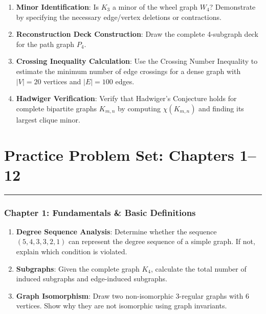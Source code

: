 \documentclass[
]{book}
\providecommand{\tightlist}{%
  \setlength{\itemsep}{0pt}\setlength{\parskip}{0pt}}
\theoremstyle{definition}
\theoremstyle{definition}
\theoremstyle{definition}
\theoremstyle{definition}
\theoremstyle{remark}
\begin{document}
\begin{enumerate}
\def\labelenumi{\arabic{enumi}.}
\tightlist
\item
  \textbf{Minor Identification}: Is \(K_3\) a minor of the wheel graph \(W_4\)? Demonstrate by specifying the necessary edge/vertex deletions or contractions.
\item
  \textbf{Reconstruction Deck Construction}: Draw the complete 4-subgraph deck for the path graph \(P_4\).
\item
  \textbf{Crossing Inequality Calculation}: Use the Crossing Number Inequality to estimate the minimum number of edge crossings for a dense graph with \(\vert{}V\vert{} = 20\) vertices and \(\vert{}E\vert{} = 100\) edges.
\item
  \textbf{Hadwiger Verification}: Verify that Hadwiger's Conjecture holds for complete bipartite graphs \(K_{m,n}\) by computing \(\chi(K_{m,n})\) and finding its largest clique minor.
\end{enumerate}

\chapter{Practice Problem Set: Chapters 1--12}\label{practice-problem-set-chapters-112}

\begin{center}\rule{0.5\linewidth}{0.5pt}\end{center}

\subsection{Chapter 1: Fundamentals \& Basic Definitions}\label{chapter-1-fundamentals-basic-definitions}

\begin{enumerate}
\def\labelenumi{\arabic{enumi}.}
\tightlist
\item
  \textbf{Degree Sequence Analysis}: Determine whether the sequence \((5, 4, 3, 3, 2, 1)\) can represent the degree sequence of a simple graph. If not, explain which condition is violated.
\item
  \textbf{Subgraphs}: Given the complete graph \(K_4\), calculate the total number of induced subgraphs and edge-induced subgraphs.
\item
  \textbf{Graph Isomorphism}: Draw two non-isomorphic 3-regular graphs with 6 vertices. Show why they are not isomorphic using graph invariants.
\end{enumerate}
\end{document}
